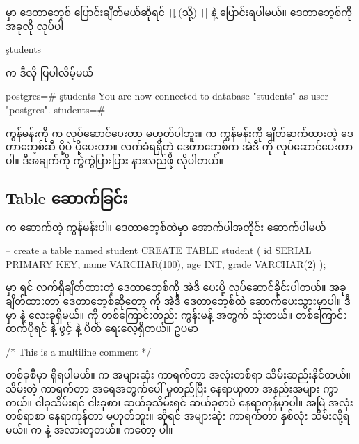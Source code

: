  မှာ ဒေတာဘေ့စ် ပြောင်းချိတ်မယ်ဆိုရင် \texttt|\c| (သို့) \texttt|\connect| နဲ့ ပြောင်းရပါမယ်။  ဒေတာဘေ့စ်ကို အခုလို  လုပ်ပါ
\begin{codetxt}
\c students
\end{codetxt}
 က ဒီလို ပြပါလိမ့်မယ်
\begin{codetxt}
postgres=# \c students
You are now connected to database "students" as user "postgres".
students=#
\end{codetxt}

\begin{mytcbox}
 ကွန်မန်းကို  က လုပ်ဆောင်ပေးတာ မဟုတ်ပါဘူး။  က  ကွန်မန်းကို ချိတ်ဆက်ထားတဲ့ ဒေတာဘေ့စ်ဆီ ပို့ပဲ ပို့ပေးတာ။ လက်ခံရရှိတဲ့ ဒေတာဘေ့စ်က အဲဒီ  ကို လုပ်ဆောင်ပေးတာပါ။ ဒီအချက်ကို ကွဲကွဲပြားပြား နားလည်ဖို့ လိုပါတယ်။
\end{mytcbox}

\subsection*{Table ဆောက်ခြင်း}
 က  ဆောက်တဲ့  ကွန်မန်းပါ။  ဒေတာဘေ့စ်ထဲမှာ  အောက်ပါအတိုင်း ဆောက်ပါမယ်
%
\begin{sql}
-- create a table named student 
CREATE TABLE student (
    id SERIAL PRIMARY KEY,
    name VARCHAR(100),
    age INT,
    grade VARCHAR(2)
);
\end{sql}
%  
 မှာ   ရင် လက်ရှိချိတ်ထားတဲ့ ဒေတာဘေ့စ်ကို အဲဒီ  ပေးပို့ လုပ်ဆောင်ခိုင်းပါတယ်။ အခုချိတ်ထားတာ  ဒေတာဘေ့စ်ဆိုတော့  ကို အဲဒီ ဒေတာဘေ့စ်ထဲ ဆောက်ပေးသွားမှာပါ။ ဒီ  မှာ \fEn{,} \fEn{,}  နဲ့   လေးခုရှိမယ်။ \fCode{--} ကို တစ်ကြောင်းတည်း ကွန်းမန့် အတွက် သုံးတယ်။ တစ်ကြောင်းထက်ပိုရင် \fCode{/*} နဲ့ ဖွင့် \fCode{*/} နဲ့ ပိတ် ရေးလေ့ရှိတယ်။ ဥပမာ
%
\begin{sql}
/* This is a
   multiline comment */
\end{sql}
%

 တစ်ခုစီမှာ  ရှိရပါမယ်။  က အများဆုံး ကာရက်တာ အလုံးတစ်ရာ သိမ်းဆည်းနိုင်တယ်။ သိမ်းတဲ့ ကာရက်တာ အရေအတွက်ပေါ် မူတည်ပြီး နေရာယူတာ အနည်းအများ ကွာတယ်။ ငါခုသိမ်းရင် ငါးခုစာ၊ ဆယ်ခုသိမ်းရင် ဆယ်ခုစာပဲ နေရာကုန်မှာပါ။ အမြဲ အလုံး တစ်ရာစာ နေရာကုန်တာ မဟုတ်ဘူး။  ဆိုရင် အများဆုံး  ကာရက်တာ နှစ်လုံး သိမ်းလို့ရမယ်။   က   နဲ့ အလားတူတယ်။  ကတော့  ပါ။

